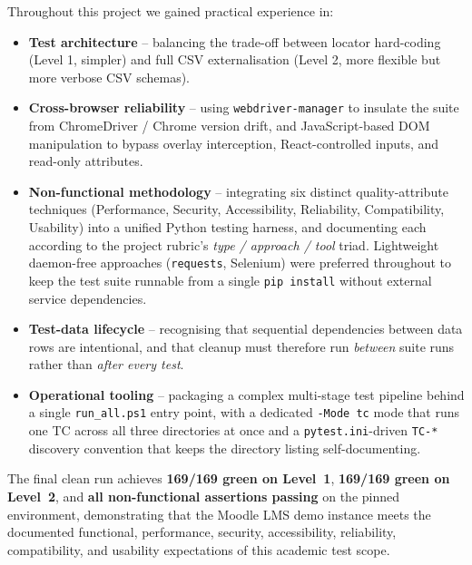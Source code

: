 \documentclass[twoside,final]{hcmut-report}
\begin{document}
Throughout this project we gained practical experience in:
\begin{itemize}
    \item \textbf{Test architecture} -- balancing the trade-off between locator hard-coding (Level 1, simpler) and full CSV externalisation (Level 2, more flexible but more verbose CSV schemas).
    \item \textbf{Cross-browser reliability} -- using \texttt{webdriver-manager} to insulate the suite from ChromeDriver / Chrome version drift, and JavaScript-based DOM manipulation to bypass overlay interception, React-controlled inputs, and read-only attributes.
    \item \textbf{Non-functional methodology} -- integrating six distinct quality-attribute techniques (Performance, Security, Accessibility, Reliability, Compatibility, Usability) into a unified Python testing harness, and documenting each according to the project rubric's \emph{type / approach / tool} triad. Lightweight daemon-free approaches (\texttt{requests}, Selenium) were preferred throughout to keep the test suite runnable from a single \texttt{pip install} without external service dependencies.
    \item \textbf{Test-data lifecycle} -- recognising that sequential dependencies between data rows are intentional, and that cleanup must therefore run \emph{between} suite runs rather than \emph{after every test}.
    \item \textbf{Operational tooling} -- packaging a complex multi-stage test pipeline behind a single \texttt{run\_all.ps1} entry point, with a dedicated \texttt{-Mode tc} mode that runs one TC across all three directories at once and a \texttt{pytest.ini}-driven \texttt{TC-*} discovery convention that keeps the directory listing self-documenting.
\end{itemize}

The final clean run achieves \textbf{169/169 green on Level~1}, \textbf{169/169 green on Level~2}, and \textbf{all non-functional assertions passing} on the pinned environment, demonstrating that the Moodle LMS demo instance meets the documented functional, performance, security, accessibility, reliability, compatibility, and usability expectations of this academic test scope.
\end{document}
